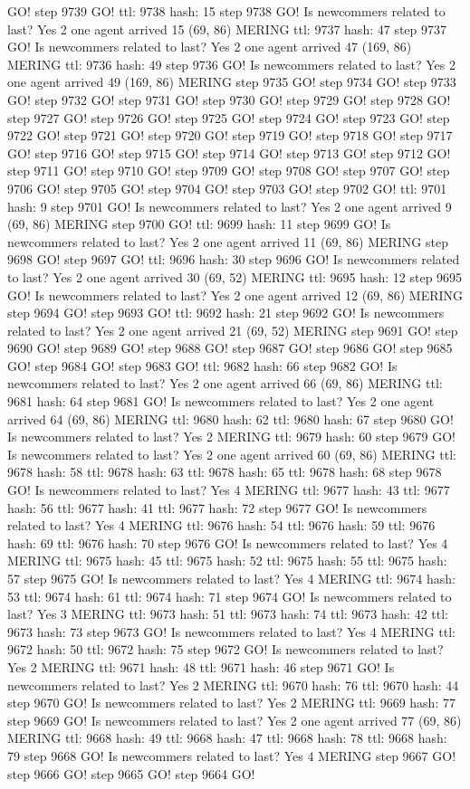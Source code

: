 GO! step 9739 GO! ttl: 9738 hash: 15 step 9738 GO! Is newcommers related to last? Yes 2 one agent arrived 15 (69, 86) MERING ttl: 9737 hash: 47 step 9737 GO! Is newcommers related to last? Yes 2 one agent arrived 47 (169, 86) MERING ttl: 9736 hash: 49 step 9736 GO! Is newcommers related to last? Yes 2 one agent arrived 49 (169, 86) MERING step 9735 GO! step 9734 GO! step 9733 GO! step 9732 GO! step 9731 GO! step 9730 GO! step 9729 GO! step 9728 GO! step 9727 GO! step 9726 GO! step 9725 GO! step 9724 GO! step 9723 GO! step 9722 GO! step 9721 GO! step 9720 GO! step 9719 GO! step 9718 GO! step 9717 GO! step 9716 GO! step 9715 GO! step 9714 GO! step 9713 GO! step 9712 GO! step 9711 GO! step 9710 GO! step 9709 GO! step 9708 GO! step 9707 GO! step 9706 GO! step 9705 GO! step 9704 GO! step 9703 GO! step 9702 GO! ttl: 9701 hash: 9 step 9701 GO! Is newcommers related to last? Yes 2 one agent arrived 9 (69, 86) MERING step 9700 GO! ttl: 9699 hash: 11 step 9699 GO! Is newcommers related to last? Yes 2 one agent arrived 11 (69, 86) MERING step 9698 GO! step 9697 GO! ttl: 9696 hash: 30 step 9696 GO! Is newcommers related to last? Yes 2 one agent arrived 30 (69, 52) MERING ttl: 9695 hash: 12 step 9695 GO! Is newcommers related to last? Yes 2 one agent arrived 12 (69, 86) MERING step 9694 GO! step 9693 GO! ttl: 9692 hash: 21 step 9692 GO! Is newcommers related to last? Yes 2 one agent arrived 21 (69, 52) MERING step 9691 GO! step 9690 GO! step 9689 GO! step 9688 GO! step 9687 GO! step 9686 GO! step 9685 GO! step 9684 GO! step 9683 GO! ttl: 9682 hash: 66 step 9682 GO! Is newcommers related to last? Yes 2 one agent arrived 66 (69, 86) MERING ttl: 9681 hash: 64 step 9681 GO! Is newcommers related to last? Yes 2 one agent arrived 64 (69, 86) MERING ttl: 9680 hash: 62 ttl: 9680 hash: 67 step 9680 GO! Is newcommers related to last? Yes 2 MERING ttl: 9679 hash: 60 step 9679 GO! Is newcommers related to last? Yes 2 one agent arrived 60 (69, 86) MERING ttl: 9678 hash: 58 ttl: 9678 hash: 63 ttl: 9678 hash: 65 ttl: 9678 hash: 68 step 9678 GO! Is newcommers related to last? Yes 4 MERING ttl: 9677 hash: 43 ttl: 9677 hash: 56 ttl: 9677 hash: 41 ttl: 9677 hash: 72 step 9677 GO! Is newcommers related to last? Yes 4 MERING ttl: 9676 hash: 54 ttl: 9676 hash: 59 ttl: 9676 hash: 69 ttl: 9676 hash: 70 step 9676 GO! Is newcommers related to last? Yes 4 MERING ttl: 9675 hash: 45 ttl: 9675 hash: 52 ttl: 9675 hash: 55 ttl: 9675 hash: 57 step 9675 GO! Is newcommers related to last? Yes 4 MERING ttl: 9674 hash: 53 ttl: 9674 hash: 61 ttl: 9674 hash: 71 step 9674 GO! Is newcommers related to last? Yes 3 MERING ttl: 9673 hash: 51 ttl: 9673 hash: 74 ttl: 9673 hash: 42 ttl: 9673 hash: 73 step 9673 GO! Is newcommers related to last? Yes 4 MERING ttl: 9672 hash: 50 ttl: 9672 hash: 75 step 9672 GO! Is newcommers related to last? Yes 2 MERING ttl: 9671 hash: 48 ttl: 9671 hash: 46 step 9671 GO! Is newcommers related to last? Yes 2 MERING ttl: 9670 hash: 76 ttl: 9670 hash: 44 step 9670 GO! Is newcommers related to last? Yes 2 MERING ttl: 9669 hash: 77 step 9669 GO! Is newcommers related to last? Yes 2 one agent arrived 77 (69, 86) MERING ttl: 9668 hash: 49 ttl: 9668 hash: 47 ttl: 9668 hash: 78 ttl: 9668 hash: 79 step 9668 GO! Is newcommers related to last? Yes 4 MERING step 9667 GO! step 9666 GO! step 9665 GO! step 9664 GO! 
